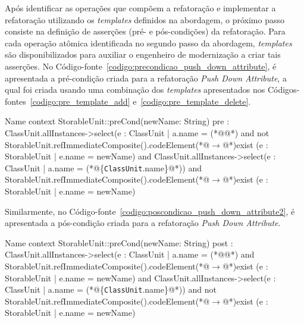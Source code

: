 Após identificar as operações que compõem a refatoração e implementar a refatoração utilizando os \textit{templates} definidos na abordagem, o próximo passo consiste na definição de asserções (pré- e pós-condições) da refatoração. Para cada operação atômica identificada no segundo passo da abordagem, \textit{templates} são disponibilizados para auxiliar o engenheiro de modernização a criar tais asserções. No Código-fonte~\ref{codigo:precondicao_push_down_attribute}, é apresentada a pré-condição criada para a refatoração \textit{Push Down Attribute}, a qual foi criada usando uma combinação dos \textit{templates} apresentados nos Códigos-fontes~\ref{codigo:pre_template_add} e~\ref{codigo:pre_template_delete}. 


\begin{codigo}[caption={[Pré-condição da refatoração \textit{Push Down Attribute}.] Pré-condição da refatoração \textit{Push Down Attribute}.},escapeinside={(*@}{@*)}, basicstyle=\footnotesize, label={codigo:precondicao_push_down_attribute}, language=OCL]{Name}
context StorableUnit::preCond(newName: String)
pre : ClassUnit.allInstances->select(e : ClassUnit | a.name = (*@@*) and not StorableUnit.refImmediateComposite().codeElement(*@$\rightarrow$@*)exist (e : StorableUnit | e.name = newName) 
and ClassUnit.allInstances->select(e : ClassUnit | a.name = (*@\{\texttt{ClassUnit}.name\}@*)) and StorableUnit.refImmediateComposite().codeElement(*@$\rightarrow$@*)exist (e : StorableUnit | e.name = newName)
\end{codigo}

Similarmente, no Código-fonte~\ref{codigo:poscondicao_push_down_attribute2}, é apresentada a pós-condição criada para a refatoração \textit{Push Down Attribute}.

\begin{codigo}[caption={[Pós-condição da refatoração \textit{Push Down Attribute}.] Pós-condição da refatoração \textit{Push Down Attribute}.},escapeinside={(*@}{@*)}, basicstyle=\footnotesize, label={codigo:poscondicao_push_down_attribute2}, language=OCL]{Name}
context StorableUnit::preCond(newName: String)
post : ClassUnit.allInstances->select(e : ClassUnit | a.name = (*@@*) and StorableUnit.refImmediateComposite().codeElement(*@$\rightarrow$@*)exist (e : StorableUnit | e.name = newName) 
and ClassUnit.allInstances->select(e : ClassUnit | a.name = (*@\{\texttt{ClassUnit}.name\}@*)) and not StorableUnit.refImmediateComposite().codeElement(*@$\rightarrow$@*)exist (e : StorableUnit | e.name = newName)
\end{codigo}


